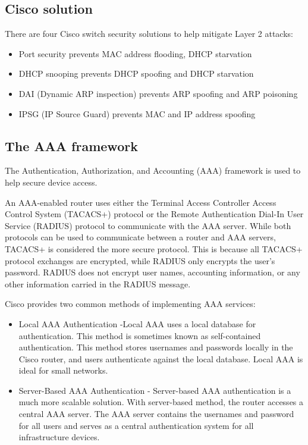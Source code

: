 \subsection{Cisco solution}
There are four Cisco switch security solutions to help mitigate Layer 2 attacks:
\begin{itemize}
\item Port security prevents MAC address flooding, DHCP starvation
\item DHCP snooping prevents DHCP spoofing and DHCP starvation
\item DAI (Dynamic ARP inspection) prevents ARP spoofing and ARP poisoning 
\item IPSG (IP Source Guard) prevents MAC and IP address spoofing
\end{itemize}
\subsection{The AAA framework}
The Authentication, Authorization, and Accounting (AAA) framework is used to help secure device access.\par 
An AAA-enabled router uses either the Terminal Access Controller Access Control System (TACACS+) protocol or the Remote Authentication Dial-In User Service (RADIUS) protocol to communicate with the AAA server. While both protocols can be used to communicate between a router and AAA servers, TACACS+ is considered the more secure protocol. This is because all TACACS+ protocol exchanges are encrypted, while RADIUS only encrypts the user’s password. RADIUS does not encrypt user names, accounting information, or any other information carried in the RADIUS message.\par 
Cisco provides two common methods of implementing AAA services:
\begin{itemize}
\item Local AAA Authentication -Local AAA uses a local database for authentication. This method is sometimes known as self-contained authentication. This method stores usernames and passwords locally in the Cisco router, and users authenticate against the local database. Local AAA is ideal for small networks.
\item Server-Based AAA Authentication - Server-based AAA authentication is a much more scalable solution. With server-based method, the router accesses a central AAA server. The AAA server contains the usernames and password for all users and serves as a central authentication system for all infrastructure devices.
\end{itemize}
